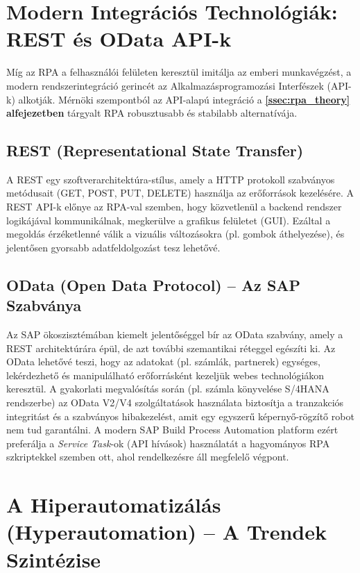\section{Modern Integrációs Technológiák: REST és OData API-k}
\label{sec:api_integration}

Míg az RPA a felhasználói felületen keresztül imitálja az emberi munkavégzést, a modern rendszerintegráció gerincét az Alkalmazásprogramozási Interfészek (API-k) alkotják. Mérnöki szempontból az API-alapú integráció a \textbf{\ref{ssec:rpa_theory} alfejezetben} tárgyalt RPA robusztusabb és stabilabb alternatívája.

\subsection{REST (Representational State Transfer)}
A REST egy szoftverarchitektúra-stílus, amely a HTTP protokoll szabványos metódusait (GET, POST, PUT, DELETE) használja az erőforrások kezelésére. A REST API-k előnye az RPA-val szemben, hogy közvetlenül a backend rendszer logikájával kommunikálnak, megkerülve a grafikus felületet (GUI). Ezáltal a megoldás érzéketlenné válik a vizuális változásokra (pl. gombok áthelyezése), és jelentősen gyorsabb adatfeldolgozást tesz lehetővé.

\subsection{OData (Open Data Protocol) – Az SAP Szabványa}
Az SAP ökoszisztémában kiemelt jelentőséggel bír az OData szabvány, amely a REST architektúrára épül, de azt további szemantikai réteggel egészíti ki. Az OData lehetővé teszi, hogy az adatokat (pl. számlák, partnerek) egységes, lekérdezhető és manipulálható erőforrásként kezeljük webes technológiákon keresztül.
A gyakorlati megvalósítás során (pl. számla könyvelése S/4HANA rendszerbe) az OData V2/V4 szolgáltatások használata biztosítja a tranzakciós integritást és a szabványos hibakezelést, amit egy egyszerű képernyő-rögzítő robot nem tud garantálni. A modern SAP Build Process Automation platform ezért preferálja a \textit{Service Task}-ok (API hívások) használatát a hagyományos RPA szkriptekkel szemben ott, ahol rendelkezésre áll megfelelő végpont.


\section{A Hiperautomatizálás (Hyperautomation) – A Trendek Szintézise}
\label{ssec:hyperautomation}

